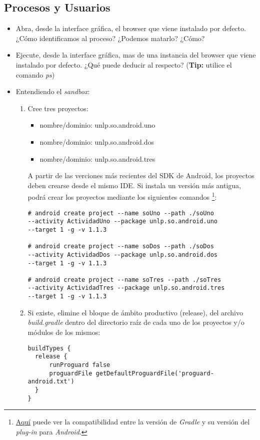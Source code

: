 \subsection{Procesos y Usuarios}
\begin{itemize}
    \item Abra, desde la interface gráfica, el browser que viene instalado por defecto. ¿Cómo identificamos al proceso? ¿Podemos matarlo? ¿Cómo?
    
    \item Ejecute, desde la interface gráfica, mas de una instancia del browser que viene instalado por defecto. ¿Qué puede deducir al respecto? (\textbf{Tip:} utilice el comando \textit{ps})
    
    \item Entendiendo el \textit{sandbox}:
    \begin{enumerate}
    \item Cree tres proyectos:
        \begin{itemize}
         \item nombre/dominio: unlp.so.android.uno
         \item nombre/dominio: unlp.so.android.dos
         \item nombre/dominio: unlp.so.android.tres
        \end{itemize}
    
    A partir de las verciones más recientes del SDK de Android, los proyectos deben crearse desde el mismo IDE. Si instala un versión más antigua, podrá crear los proyectos mediante los siguientes comandos \footnote{\href{http://tools.android.com/tech-docs/new-build-system/version-compatibility}{Aquí} puede ver la compatibilidad entre la versión de \textit{Gradle} y su versión del \textit{plug-in} para \textit{Android}.}:
    \begin{lstlisting}
# android create project --name soUno --path ./soUno 
--activity ActividadUno --package unlp.so.android.uno 
--target 1 -g -v 1.1.3

# android create project --name soDos --path ./soDos 
--activity ActividadDos --package unlp.so.android.dos 
--target 1 -g -v 1.1.3

# android create project --name soTres --path ./soTres 
--activity ActividadTres --package unlp.so.android.tres 
--target 1 -g -v 1.1.3
    \end{lstlisting}
    
    \item Si existe, elimine el bloque de ámbito productivo (release), del archivo \textit{build.gradle} dentro del directorio raíz de cada uno de los proyectos y/o módulos de los mismos:
    \begin{lstlisting}
buildTypes {
  release {
      runProguard false
      proguardFile getDefaultProguardFile('proguard-android.txt')
  }
}
    \end{lstlisting}
    

\end{enumerate}
\end{itemize}
